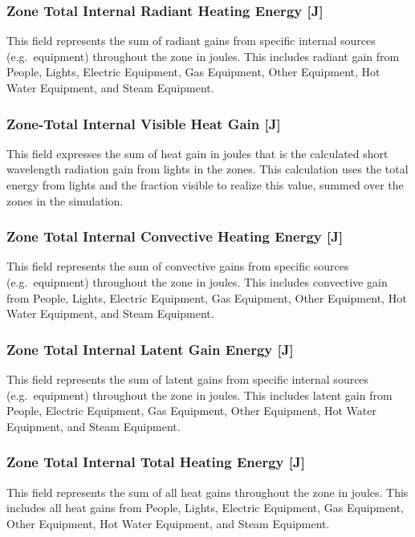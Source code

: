 \subsubsection{Zone Total Internal Radiant Heating Energy {[}J{]}}\label{zone-total-internal-radiant-heating-energy-j-1}

This field represents the sum of radiant gains from specific internal sources (e.g.~equipment) throughout the zone in joules. This includes radiant gain from People, Lights, Electric Equipment, Gas Equipment, Other Equipment, Hot Water Equipment, and Steam Equipment.

\subsubsection{Zone-Total Internal Visible Heat Gain {[}J{]}}\label{zone-total-internal-visible-heat-gain-j}

This field expresses the sum of heat gain in joules that is the calculated short wavelength radiation gain from lights in the zones. This calculation uses the total energy from lights and the fraction visible to realize this value, summed over the zones in the simulation.

\subsubsection{Zone Total Internal Convective Heating Energy {[}J{]}}\label{zone-total-internal-convective-heating-energy-j-1}

This field represents the sum of convective gains from specific sources (e.g.~equipment) throughout the zone in joules. This includes convective gain from People, Lights, Electric Equipment, Gas Equipment, Other Equipment, Hot Water Equipment, and Steam Equipment.

\subsubsection{Zone Total Internal Latent Gain Energy {[}J{]}}\label{zone-total-internal-latent-gain-energy-j-1}

This field represents the sum of latent gains from specific internal sources (e.g.~equipment) throughout the zone in joules. This includes latent gain from People, Electric Equipment, Gas Equipment, Other Equipment, Hot Water Equipment, and Steam Equipment.

\subsubsection{Zone Total Internal Total Heating Energy {[}J{]}}\label{zone-total-internal-total-heating-energy-j-1}

This field represents the sum of all heat gains throughout the zone in joules. This includes all heat gains from People, Lights, Electric Equipment, Gas Equipment, Other Equipment, Hot Water Equipment, and Steam Equipment.
